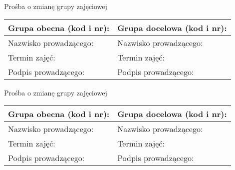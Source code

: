 \documentclass{wmiisubmission}
\begin{document}
\studentinfo

\vskip 1.5cm

\begin{center}
    Prośba o zmianę grupy zajęciowej
\end{center}

\begin{tabularx}{\textwidth}{|X|X|}
    \hline
    Grupa obecna \textbf{(kod i nr)}: & Grupa docelowa \textbf{(kod i nr)}: \\
    \hline
    Nazwisko prowadzącego:  & Nazwisko prowadzącego: \\
    \hline
    Termin zajęć:  & Termin zajęć: \\
    \hline
    Podpis prowadzącego:  & Podpis prowadzącego: \\
    \hline
\end{tabularx}

\vfill

\studentinfo

\vskip 1.5cm

\begin{center}
    Prośba o zmianę grupy zajęciowej
\end{center}

\begin{tabularx}{\textwidth}{|X|X|}
    \hline
    Grupa obecna \textbf{(kod i nr)}: & Grupa docelowa \textbf{(kod i nr)}: \\
    \hline
    Nazwisko prowadzącego:  & Nazwisko prowadzącego: \\
    \hline
    Termin zajęć:  & Termin zajęć: \\
    \hline
    Podpis prowadzącego:  & Podpis prowadzącego: \\
    \hline
\end{tabularx}
\end{document}
